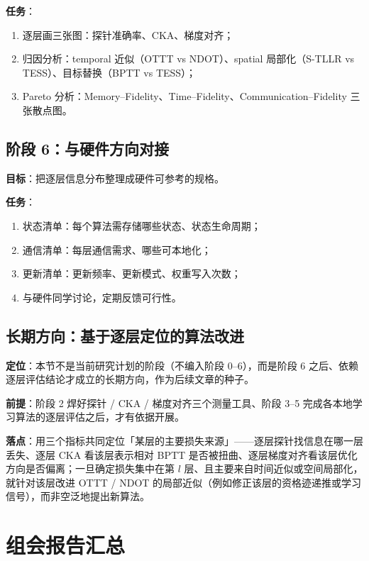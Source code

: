 \documentclass[journal,12pt,onecolumn]{IEEEtran}
\begin{document}
\textbf{任务}：
\begin{enumerate}[leftmargin=1.5em,itemsep=0pt]
\item 逐层画三张图：探针准确率、CKA、梯度对齐；
\item 归因分析：temporal 近似（OTTT vs NDOT）、spatial 局部化（S-TLLR vs TESS）、目标替换（BPTT vs TESS）；
\item Pareto 分析：Memory--Fidelity、Time--Fidelity、Communication--Fidelity 三张散点图。
\end{enumerate}

\subsection{阶段 6：与硬件方向对接}

\textbf{目标}：把逐层信息分布整理成硬件可参考的规格。

\textbf{任务}：
\begin{enumerate}[leftmargin=1.5em,itemsep=0pt]
\item 状态清单：每个算法需存储哪些状态、状态生命周期；
\item 通信清单：每层通信需求、哪些可本地化；
\item 更新清单：更新频率、更新模式、权重写入次数；
\item 与硬件同学讨论，定期反馈可行性。
\end{enumerate}

\subsection{长期方向：基于逐层定位的算法改进}

\textbf{定位}：本节不是当前研究计划的阶段（不编入阶段 0--6），而是阶段 6 之后、依赖逐层评估结论才成立的长期方向，作为后续文章的种子。

\textbf{前提}：阶段 2 焊好探针 / CKA / 梯度对齐三个测量工具、阶段 3--5 完成各本地学习算法的逐层评估之后，才有依据开展。

\textbf{落点}：用三个指标共同定位「某层的主要损失来源」——逐层探针找信息在哪一层丢失、逐层 CKA 看该层表示相对 BPTT 是否被扭曲、逐层梯度对齐看该层优化方向是否偏离；一旦确定损失集中在第 $l$ 层、且主要来自时间近似或空间局部化，就针对该层改进 OTTT / NDOT 的局部近似（例如修正该层的资格迹递推或学习信号），而非空泛地提出新算法。

\section{组会报告汇总}
\end{document}
